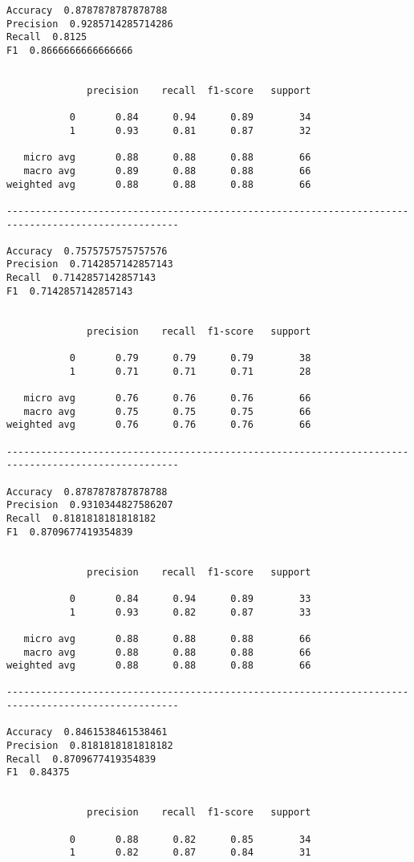 \documentclass[11pt]{article}
\begin{document}
    \begin{Verbatim}[commandchars=\\\{\}]
Accuracy  0.8787878787878788
Precision  0.9285714285714286
Recall  0.8125
F1  0.8666666666666666


              precision    recall  f1-score   support

           0       0.84      0.94      0.89        34
           1       0.93      0.81      0.87        32

   micro avg       0.88      0.88      0.88        66
   macro avg       0.89      0.88      0.88        66
weighted avg       0.88      0.88      0.88        66

---------------------------------------------------------------------------------------------------- 

Accuracy  0.7575757575757576
Precision  0.7142857142857143
Recall  0.7142857142857143
F1  0.7142857142857143


              precision    recall  f1-score   support

           0       0.79      0.79      0.79        38
           1       0.71      0.71      0.71        28

   micro avg       0.76      0.76      0.76        66
   macro avg       0.75      0.75      0.75        66
weighted avg       0.76      0.76      0.76        66

---------------------------------------------------------------------------------------------------- 

Accuracy  0.8787878787878788
Precision  0.9310344827586207
Recall  0.8181818181818182
F1  0.8709677419354839


              precision    recall  f1-score   support

           0       0.84      0.94      0.89        33
           1       0.93      0.82      0.87        33

   micro avg       0.88      0.88      0.88        66
   macro avg       0.88      0.88      0.88        66
weighted avg       0.88      0.88      0.88        66

---------------------------------------------------------------------------------------------------- 

Accuracy  0.8461538461538461
Precision  0.8181818181818182
Recall  0.8709677419354839
F1  0.84375


              precision    recall  f1-score   support

           0       0.88      0.82      0.85        34
           1       0.82      0.87      0.84        31


\end{Verbatim}
\end{document}
